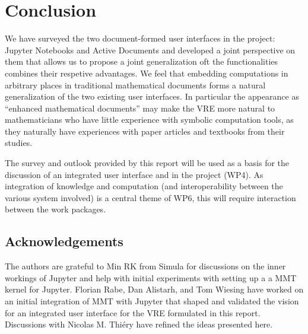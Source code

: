\section{Conclusion}\label{sec:concl}
We have surveyed the two document-formed user interfaces in the \pn project: Jupyter
Notebooks and Active Documents and developed a joint perspective on them that allows us to
propose a joint generalization oft the functionalities combines their respetive
advantages. We feel that embedding computations in arbitrary places in traditional
mathematical documents forms a natural generalization of the two existing user
interfaces. In particular the appearance as ``enhanced mathematical documents'' may make
the VRE more natural to mathematicians who have little experience with symbolic
computation tools, as they naturally have experiences with paper articles and textbooks
from their studies.

The survey and outlook provided by this report will be used as a basis for the discussion
of an integrated user interface and in the \pn project (WP4). As integration of knowledge
and computation (and interoperability between the various system involved) is a central
theme of WP6, this will require interaction between the work packages.

\subsection*{Acknowledgements} The authors are grateful to Min RK from Simula for
discussions on the inner workings of Jupyter and help with initial experiments with
setting up a a MMT kernel for Jupyter. Florian Rabe, Dan Alistarh, and Tom Wiesing have
worked on an initial integration of MMT with Jupyter that shaped and validated the vision
for an integrated user interface for the \pn VRE formulated in this report. Discussions
with Nicolas M. Thiéry have refined the ideas presented here.

